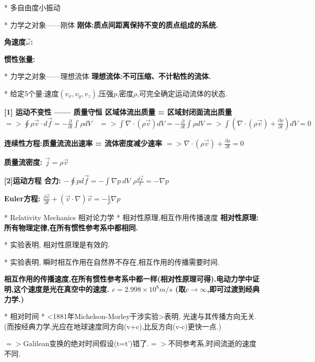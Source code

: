         * 多自由度小振动


    * 力学之对象——刚体
        \bf{刚体}:质点间距离保持不变的质点组成的系统.
        
        \bf{角速度$\vec \omega$}:
        
        \bf{惯性张量}:
    
    
    
    * 力学之对象——理想流体
        \bf{理想流体}:不可压缩、不计粘性的流体.
        
        * 给定5个量:速度$(v_x,v_y,v_z)$,压强$p$,密度$\rho$,可完全确定运动流体的状态.
        
        \bf{[1] 运动不变性 —— 质量守恒}
            区域体流出质量 = 区域封闭面流出质量
            $ => \oint \rho \vec v \cdot d \vec f = -\frac{∂}{∂ t}\int \rho dV \quad => \int \nabla \cdot (\rho \vec v) dV  = -\frac{∂}{∂ t}\int \rho dV =>  \int (\nabla \cdot (\rho \vec v) + \frac{∂ \rho}{∂ t}) dV  = 0$
        
        \bf{连续性方程}:质量流流出速率 = 流体密度减少速率
            $ => \nabla \cdot (\rho \vec v) +  \frac{∂ \rho}{∂ t} = 0$
        
        \bf{质量流密度}:
            $\vec j = \rho \vec v$
        
        \bf{[2]运动方程}
            合力:
            $-\oint p d \vec f = -\int \nabla p\ dV$
            $\rho \frac{d \vec v}{t} = -\nabla p$
        
        \bf{Euler方程}:
            $\frac{∂ \vec v}{∂ t} + (\vec v \cdot \nabla)\vec v = - \frac{1}{\rho}\nabla p$


* Relativity Mechanics 相对论力学
    * 相对性原理,相互作用传播速度
        \bf{相对性原理}: 所有物理定律,在所有惯性参考系中都相同.
        
        * 实验表明, 相对性原理是有效的.
        
        * 实验表明, 瞬时相互作用在自然界不存在,相互作用的传播需要时间.
        
        \bf{相互作用的传播速度},在所有惯性参考系中都一样(相对性原理可得).\quad 电动力学中证明,这个速度是光在真空中的速度.
            $c = 2.998 \times 10^8 m/s$
            (取$c\to \infty$,即可过渡到经典力学.)


    * 相对时间
        * <1881年Michelson-Morley干涉实验>表明, 光速与其传播方向无关. (而按经典力学,光应在地球速度同方向(v+c),比反方向(v-c)更快一点.)
        
        $ =>$Galilean变换的绝对时间假设(t=t')错了.\quad  $ =>$不同参考系,时间流逝的速度不同.
        
